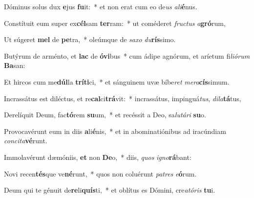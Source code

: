 \item Dóminus solus dux \textbf{e}jus \textbf{fu}it:~* et non erat cum eo de\textit{us} \textit{a}\textit{li}\textbf{é}nus.
\item Constítuit eum super ex\textbf{cél}sam \textbf{ter}ram:~* ut coméderet \textit{fruc}\textit{tus} \textit{a}\textbf{gró}rum,
\item Ut súgeret \textbf{mel} de \textbf{pe}tra,~* oleúmque de \textit{sa}\textit{xo} \textit{du}\textbf{rís}simo.
\item Butýrum de arménto, et \textbf{lac} de \textbf{ó}\textbf{vi}bus~* cum ádipe agnórum, et aríetum fi\textit{li}\textit{ó}\textit{rum} \textbf{Ba}san:
\item Et hircos cum me\textbf{dúl}la \textbf{trí}\textbf{ti}ci,~* et sánguinem uvæ bíbe\textit{ret} \textit{me}\textit{ra}\textbf{cís}simum.
\item Incrassátus est diléctus, et re\textbf{cal}ci\textbf{trá}vit:~* incrassátus, impinguá\textit{tus}, \textit{di}\textit{la}\textbf{tá}tus,
\item Derelíquit Deum, fac\textbf{tó}rem \textbf{su}um,~* et recéssit a Deo, sa\textit{lu}\textit{tá}\textit{ri} \textbf{su}o.
\item Provocavérunt eum in diis \textbf{a}li\textbf{é}nis,~* et in abominatiónibus ad iracúndiam \textit{con}\textit{ci}\textit{ta}\textbf{vé}runt.
\item Immolavérunt dæmóniis, \textbf{et} non \textbf{De}o,~* diis, \textit{quos} \textit{i}\textit{gno}\textbf{rá}bant:
\item Novi recen\textbf{tés}que ve\textbf{né}runt,~* quos non coluérunt \textit{pa}\textit{tres} \textit{e}\textbf{ó}rum.
\item Deum qui te génuit de\textbf{re}li\textbf{quís}ti,~* et oblítus es Dómini, cre\textit{a}\textit{tó}\textit{ris} \textbf{tu}i.
